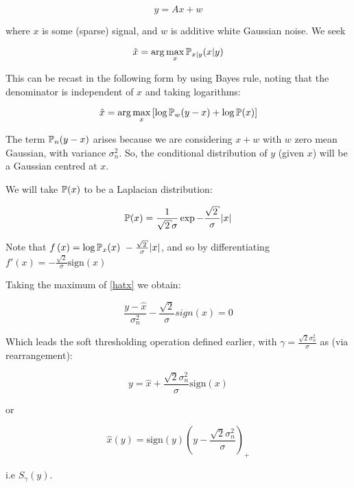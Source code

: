\begin{example}
\begin{equation}
y = Ax + w
\end{equation}

where \(x\) is some (sparse) signal, and \(w\) is additive white Gaussian noise. We seek

\begin{equation}
\hat{x} = \arg\max_x {\mathbb{P}}_{x|y}{\left(x|y\right)}
\end{equation}

This can be recast in the following form by using Bayes rule, noting that the denominator is independent of \(x\) and taking logarithms:

\begin{equation}
\hat{x} = \arg\max_x \left[\log{{\mathbb{P}}_{w}{\left(y-x\right)}}+\log{{\mathbb{P}}{\left(x\right)}}\right]
\label{hatx}
\end{equation}

The term \({\mathbb{P}}_{n}{\left(y-x\right)}\) arises because we are considering \(x+w\) with \(w\) zero mean Gaussian, with variance \(\sigma_n^2\). So, the conditional distribution of \(y\) (given \(x\)) will be a Gaussian centred at \(x\).

We will take \({\mathbb{P}}{\left(x\right)}\) to be a Laplacian distribution:

\begin{equation}
\pr{\left(x\right)} = \frac{1}{\sqrt{2}\sigma}\exp{-\frac{\sqrt{2}}{\sigma}|x|}
\end{equation}

Note that \( f\left(x\right) = \log{\pr_x{ \left( x \right)}} ~ -\frac{\sqrt{2}}{\sigma} |x| \), and so by differentiating \( f'\left(x\right) = -\frac{\sqrt{2}}{\sigma} \mathrm{sign}\left(x\right) \)

Taking the maximum of \ref{hatx} we obtain:

\begin{equation}
\frac{y-\hat{x}}{\sigma^2_n}-\frac{\sqrt{2}}{\sigma}sign(x) = 0
\end{equation}

Which leads the soft thresholding operation defined earlier, with \(\gamma = \frac{\sqrt{2}\sigma^2_n}{\sigma}\) as (via rearrangement):

$$
y =  \hat{x} + \frac{\sqrt{2}\sigma^2_n}{\sigma}\mathrm{sign}\left(x\right)
$$

or

$$
\hat{x}\left(y\right) = \mathrm{sign}(y)\left(y - \frac{\sqrt{2}\sigma^2_n}{\sigma}\right)_+
$$

i.e \(S_\gamma(y)\).
\end{example}

